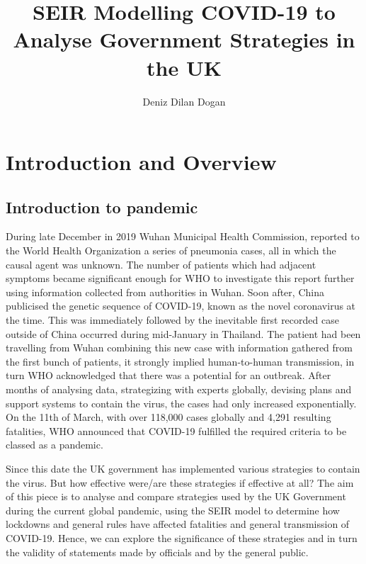 \documentclass[11pt]{article}
\title{SEIR Modelling COVID-19 to Analyse Government Strategies in the UK}
\author{Deniz Dilan Dogan}
\begin{document}
	\maketitle
	\tableofcontents
\pagebreak
\section{Introduction and Overview}
\subsection{Introduction to pandemic}
During late December in 2019 Wuhan Municipal Health Commission, reported to the World Health Organization a series of pneumonia cases, all in which the causal agent was unknown. The number of patients which had adjacent symptoms became significant enough for WHO to investigate this report further using information collected from authorities in Wuhan. Soon after, China publicised the genetic sequence of COVID-19, known as the novel coronavirus at the time. This was immediately followed by the inevitable first recorded case outside of China occurred during mid-January in Thailand. The patient had been travelling from Wuhan combining this new case with information gathered from the first bunch of patients, it strongly implied human-to-human transmission, in turn WHO acknowledged that there was a potential for an outbreak. After months of analysing data, strategizing with experts globally, devising plans and support systems to contain the virus, the cases had only increased exponentially. On the 11th of March, with over 118,000 cases globally and 4,291 resulting fatalities, WHO announced that COVID-19 fulfilled the required criteria to be classed as a pandemic\citep{WHO'stimelineofCOVID-19}.  \par
Since this date the UK government has implemented various strategies to contain the virus. But how effective were/are these strategies if effective at all? The aim of this piece is to analyse and compare strategies used by the UK Government during the current global pandemic, using the SEIR model to determine how lockdowns and general rules have affected fatalities and general transmission of COVID-19. Hence, we can explore the significance of these strategies and in turn the validity of statements made by officials and by the general public.
\end{document}
